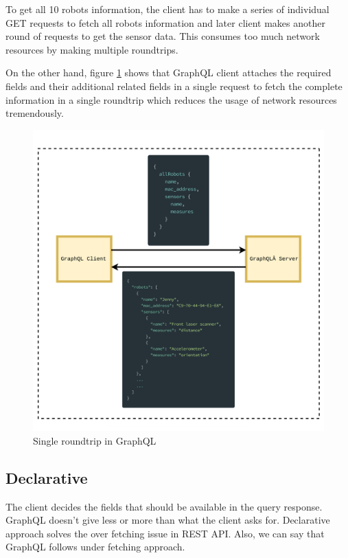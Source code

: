    To get all 10 robots information, the client has to make a series of individual GET requests to fetch all robots information and later client makes another round of requests to get the sensor data. This consumes too much network resources by making multiple roundtrips.
 
 	On the other hand, figure \ref{fig:graphql_roundtrip} shows that GraphQL client attaches the required fields and their additional related fields in a single request to fetch the complete information in a single roundtrip which reduces the usage of network resources tremendously.  
	
	\begin{figure}[!htbp] 
		\begin{center}
			\includegraphics[trim={0 0 0 2cm},clip,scale=0.09]{./images/png/graphql_roundtrip}	
			\caption{Single roundtrip in GraphQL}	
			\label{fig:graphql_roundtrip}	
		\end{center}
	\end{figure}

	\subsection{Declarative}
	The client decides the fields that should be available in the query response. GraphQL doesn't give less or more than what the client asks for.  Declarative approach solves the over fetching issue in REST API. Also, we can say that GraphQL follows under fetching approach. 
	
